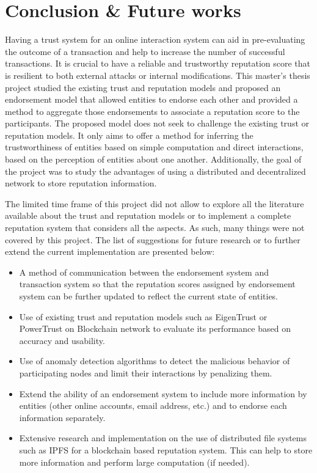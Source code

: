 \chapter{Conclusion \& Future works} \label{ch:conclusion}
Having a trust system for an online interaction system can aid in
pre-evaluating the outcome of a transaction and help to increase the number of
successful transactions. It is crucial to have a reliable and trustworthy
reputation score that is resilient to both external attacks or internal
modifications. This master's thesis project studied the existing trust and
reputation models and proposed an endorsement model that allowed entities to
endorse each other and provided a method to aggregate those endorsements to
associate a reputation score to the participants. The proposed model does not
seek to challenge the existing trust or reputation models. It only aims to
offer a method for inferring the trustworthiness of entities based on simple
computation and direct interactions, based on the perception of entities about
one another. Additionally, the goal of the project was to study the advantages
of using a distributed and decentralized network to store reputation
information.  \par
The limited time frame of this project did not allow to explore all the literature available about the trust and reputation models or to implement a complete reputation system that considers all the aspects. As such, many things were not covered by this project. The list of suggestions for future research or to further extend the current implementation are presented below: 
\begin{itemize}
	\item A method of communication between the endorsement system and
	transaction system so that the reputation scores assigned by endorsement
	system can be further updated to reflect the current state of entities. 
	\item Use of existing trust and reputation models such as EigenTrust or
	PowerTrust on Blockchain network to evaluate its performance based on
	accuracy and usability.
	\item Use of anomaly detection algorithms to detect the malicious behavior
	of participating nodes and limit their interactions by penalizing them. 
	\item Extend the ability of an endorsement system to include more
	information by entities (other online accounts, email address, etc.) and to
	endorse each information separately. 
	\item Extensive research and implementation on the use of distributed file
	systems such as IPFS for a blockchain based reputation system. This can
	help to store more information and perform large computation (if needed). 
\end{itemize}
